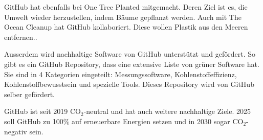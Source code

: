 GitHub hat ebenfalls bei One Tree Planted mitgemacht. Deren Ziel ist es, die Umwelt wieder herzustellen, indem Bäume gepflanzt werden.\cite{one-tree-planted} Auch mit The Ocean Cleanup hat GitHub kollaboriert. Diese wollen Plastik aus den Meeren entfernen.\cite{ocean-cleanup}.

Ausserdem wird nachhaltige Software von GitHub unterstützt und gefördert. So gibt es ein GitHub Repository, dass eine extensive Liste von grüner Software hat. Sie sind in 4 Kategorien eingeteilt: Messungssoftware, Kohlenstoffeffizienz, Kohlenstoffbewusstsein und spezielle Tools. Dieses Repository wird von GitHub selber gefördert.\cite{green-software}

GitHub ist seit 2019 CO$_{2}$-neutral und hat auch weitere nachhaltige Ziele. 2025 soll GitHub zu 100\% auf erneuerbare Energien setzen und in 2030 sogar CO$_{2}$-negativ sein.\cite{github-goals}

